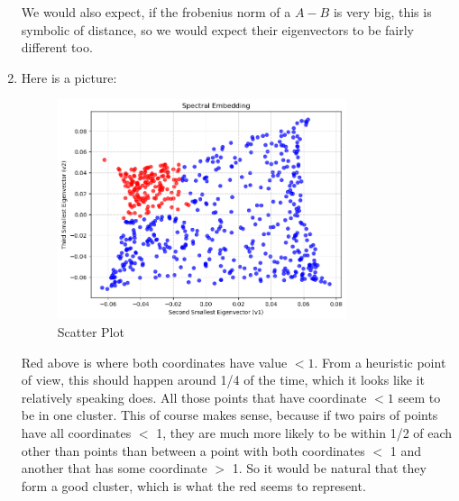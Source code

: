 \documentclass[12pt]{article}
\begin{document}
\begin{enumerate}[leftmargin=\labelsep, label=(\alph*)]
        We would also expect, if the frobenius norm of a $A-B$ is very big, this is symbolic of distance, so we would expect their eigenvectors to be fairly different too. 

        \item Here is a picture:
        \begin{figure}[H]
            \centering
            \includegraphics[width=0.8\textwidth]{spectral_embedding.png}
            \caption{Scatter Plot}
        \end{figure}
        
        Red above is where both coordinates have value $<1$. From a heuristic point of view, this should happen around 1/4 of the time, which it looks like it relatively speaking does. All those points that have coordinate $<1$ seem to be in one cluster. This of course makes sense, because if two pairs of points have all coordinates $<$ 1, they are much more likely to be within 1/2 of each other than points than between a point with both coordinates $<$ 1 and another that has some coordinate $>$ 1. So it would be natural that they form a good cluster, which is what the red seems to represent.


\end{enumerate}
\end{document}
